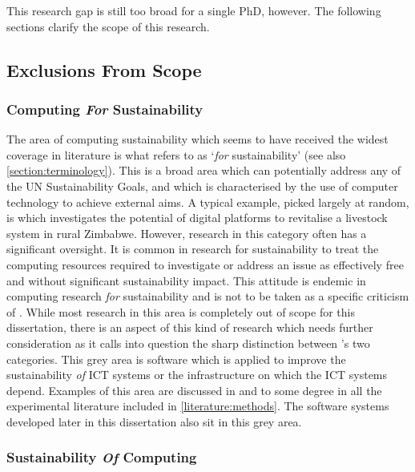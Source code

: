 This research gap is still too broad for a single PhD, however. The following sections clarify the scope of this research.

\subsection{Exclusions From Scope}

\subsubsection{Computing \emph{For} Sustainability}
\label{scope:for sustainability}

The area of computing sustainability which seems to have received the widest coverage in literature is what \citet{Penzenstadler2013} refers to as `\emph{for} sustainability' (see also \autoref{section:terminology}). This is a broad area which can potentially address any of the UN Sustainability Goals, and which is characterised by the use of computer technology to achieve external aims. A typical example, picked largely at random, is \citet{Gwaka2022} which investigates the potential of digital platforms to revitalise a livestock system in rural Zimbabwe. However, research in this category often has a significant oversight. It is common in research for sustainability to treat the computing resources required to investigate or address an issue as effectively free and without significant sustainability impact. This attitude is endemic in computing research \emph{for} sustainability and is not to be taken as a specific criticism of \citeauthor{Gwaka2022}. While most research in this area is completely out of scope for this dissertation, there is an aspect of this kind of research which needs further consideration as it calls into question the sharp distinction between \citeauthor{Penzenstadler2013}'s two categories. This grey area is software which is applied to improve the sustainability \emph{of} ICT systems or the infrastructure on which the ICT systems depend. Examples of this area are discussed in \citet{Verdecchia2022a} and to some degree in all the experimental literature included in \autoref{literature:methods}. The software systems developed later in this dissertation also sit in this grey area.

\subsubsection{Sustainability \emph{Of} Computing}
\label{scope:sustainability of}

